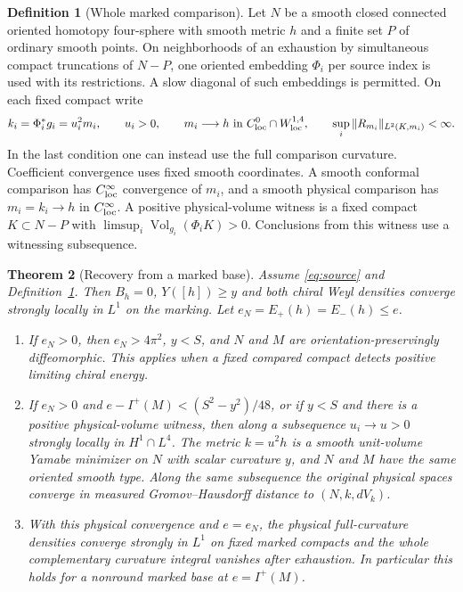 \documentclass[11pt]{article}
\newtheorem{theorem}{Theorem}[section]
\theoremstyle{definition}
\newtheorem{definition}[theorem]{Definition}
\theoremstyle{remark}
\begin{document}
\begin{definition}[Whole marked comparison]\label{def:marking}
Let \(N\) be a smooth closed connected oriented homotopy four-sphere with smooth metric \(h\) and a finite set \(P\) of ordinary smooth points. On neighborhoods of an exhaustion by simultaneous compact truncations of \(N-P\), one oriented embedding \(\Phi_i\) per source index is used with its restrictions. A slow diagonal of such embeddings is permitted. On each fixed compact write
\begin{equation}\label{eq:weak-marking}
 k_i=\Phi_i^*g_i=u_i^2 m_i,\qquad u_i>0,\qquad
 m_i\longrightarrow h\text{ in }C^0_{\rm loc}\cap W^{1,4}_{\rm loc},\qquad
 \sup_i\|R_{m_i}\|_{L^2(K,m_i)}<\infty .
\end{equation}
In the last condition one can instead use the full comparison curvature. Coefficient convergence uses fixed smooth coordinates. A smooth conformal comparison has \(C^\infty_{\rm loc}\) convergence of \(m_i\), and a smooth physical comparison has \(m_i=k_i\to h\) in \(C^\infty_{\rm loc}\). A positive physical-volume witness is a fixed compact \(K\subset N-P\) with \(\limsup_i\operatorname{Vol}_{g_i}(\Phi_i K)>0\). Conclusions from this witness use a witnessing subsequence.
\end{definition}

\begin{theorem}[Recovery from a marked base]\label{thm:marked-recovery}
Assume \eqref{eq:source} and Definition~\ref{def:marking}. Then \(B_h=0\), \(Y([h])\ge y\) and both chiral Weyl densities converge strongly locally in \(L^1\) on the marking. Let \(e_N=E_+(h)=E_-(h)\le e\).
\begin{enumerate}
 \item If \(e_N>0\), then \(e_N>4\pi^2\), \(y<S\), and \(N\) and \(M\) are orientation-preservingly diffeomorphic. This applies when a fixed compared compact detects positive limiting chiral energy.
 \item If \(e_N>0\) and \(e-I^+(M)<(S^2-y^2)/48\), or if \(y<S\) and there is a positive physical-volume witness, then along a subsequence \(u_i\to u>0\) strongly locally in \(H^1\cap L^4\). The metric \(k=u^2h\) is a smooth unit-volume Yamabe minimizer on \(N\) with scalar curvature \(y\), and \(N\) and \(M\) have the same oriented smooth type. Along the same subsequence the original physical spaces converge in measured Gromov--Hausdorff distance to \((N,k,dV_k)\).
 \item With this physical convergence and \(e=e_N\), the physical full-curvature densities converge strongly in \(L^1\) on fixed marked compacts and the whole complementary curvature integral vanishes after exhaustion. In particular this holds for a nonround marked base at \(e=I^+(M)\).
\end{enumerate}
\end{theorem}
\end{document}

